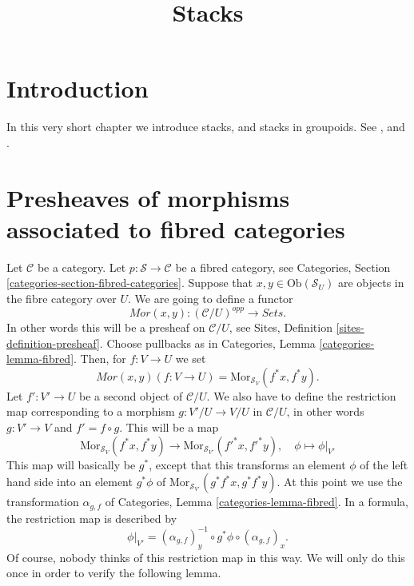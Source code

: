 

%


\title{Stacks}


\maketitle

\label{section-phantom}

\tableofcontents

\section{Introduction}
\label{section-introduction}

\noindent
In this very short chapter we introduce stacks, and
stacks in groupoids. See \cite{DM}, and \cite{Vis2}.


\section{Presheaves of morphisms associated to fibred categories}
\label{section-morphisms}

\noindent
Let $\mathcal{C}$ be a category.
Let $p : \mathcal{S} \to \mathcal{C}$ be a fibred category,
see Categories, Section \ref{categories-section-fibred-categories}.
Suppose that $x, y\in \text{Ob}(\mathcal{S}_U)$ are
objects in the fibre category over $U$. We are going to define
a functor
$$
\mathit{Mor}(x, y) : (\mathcal{C}/U)^{opp} \longrightarrow \textit{Sets}.
$$
In other words this will be a presheaf on $\mathcal{C}/U$, see
Sites, Definition \ref{sites-definition-presheaf}.
Choose pullbacks as in Categories, Lemma \ref{categories-lemma-fibred}.
Then, for $f : V \to U$ we set
$$
\mathit{Mor}(x, y)(f : V \to U) =
\text{Mor}_{\mathcal{S}_V}(f^\ast x, f^\ast y).
$$
Let $f' : V' \to U$ be a second object of $\mathcal{C}/U$.
We also have to define the restriction map corresponding to a
morphism $g : V'/U  \to V/U$ in $\mathcal{C}/U$,
in other words $g : V' \to V$ and $f' = f \circ g$.
This will be a map
$$
\text{Mor}_{\mathcal{S}_V}(f^\ast x, f^\ast y)
\longrightarrow
\text{Mor}_{\mathcal{S}_{V'}}({f'}^\ast x, {f'}^\ast y),\quad
\phi \longmapsto \phi|_{V'}
$$
This map will basically be $g^\ast$, except that this transforms
an element $\phi$ of the left hand side into an element
$g^\ast \phi$
of $\text{Mor}_{\mathcal{S}_{V'}}(g^\ast f^\ast x, g^\ast f^\ast y)$.
At this point we use the transformation $\alpha_{g, f}$ of
Categories, Lemma \ref{categories-lemma-fibred}.
In a formula, the restriction map is described by
$$
\phi|_{V'} =
(\alpha_{g, f})_y^{-1} \circ
g^\ast \phi \circ
(\alpha_{g, f})_x.
$$
Of course, nobody thinks of this restriction map in this way.
We will only do this once in order to verify the following
lemma.


